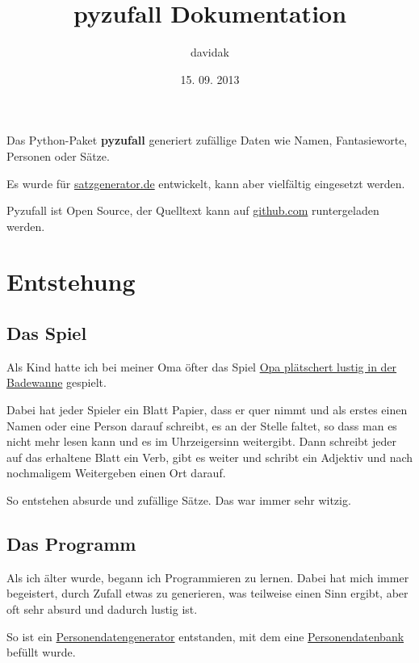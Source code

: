 \documentclass[a4paper,12pt,oneside]{sphinxmanual}
\title{pyzufall Dokumentation}
\date{15. 09. 2013}
\author{davidak}
\begin{document}
\maketitle
\tableofcontents
{}\label{index::doc}


Das Python-Paket \textbf{pyzufall} generiert zufällige Daten wie Namen, Fantasieworte, Personen oder Sätze.

Es wurde für \href{http://satzgenerator.de/}{satzgenerator.de} entwickelt, kann aber vielfältig eingesetzt werden.

Pyzufall ist Open Source, der Quelltext kann auf \href{https://github.com/davidak/pyzufall/}{github.com} runtergeladen werden.


\chapter{Entstehung}
\label{entstehung::doc}\label{entstehung:entstehung}\label{entstehung:dokumentation-von-pyzufall}

\section{Das Spiel}
\label{entstehung:das-spiel}
Als Kind hatte ich bei meiner Oma öfter das Spiel \href{http://www.mama-tipps.de/tipp/Opa-plaetschert-Badewanne.html}{Opa plätschert lustig in der Badewanne} gespielt.

Dabei hat jeder Spieler ein Blatt Papier, dass er quer nimmt und als erstes einen Namen oder eine Person darauf schreibt, es an der Stelle faltet, so dass man es nicht mehr lesen kann und es im Uhrzeigersinn weitergibt. Dann schreibt jeder auf das erhaltene Blatt ein Verb, gibt es weiter und schribt ein Adjektiv und nach nochmaligem Weitergeben einen Ort darauf.

So entstehen absurde und zufällige Sätze. Das war immer sehr witzig.


\section{Das Programm}
\label{entstehung:das-programm}
Als ich älter wurde, begann ich Programmieren zu lernen. Dabei hat mich immer begeistert, durch Zufall etwas zu generieren, was teilweise einen Sinn ergibt, aber oft sehr absurd und dadurch lustig ist.

So ist ein \href{http://davidak.de/wiki/perl/personendatengenerator}{Personendatengenerator} entstanden, mit dem eine \href{http://davidak.de/personen/}{Personendatenbank} befüllt wurde.
\end{document}
